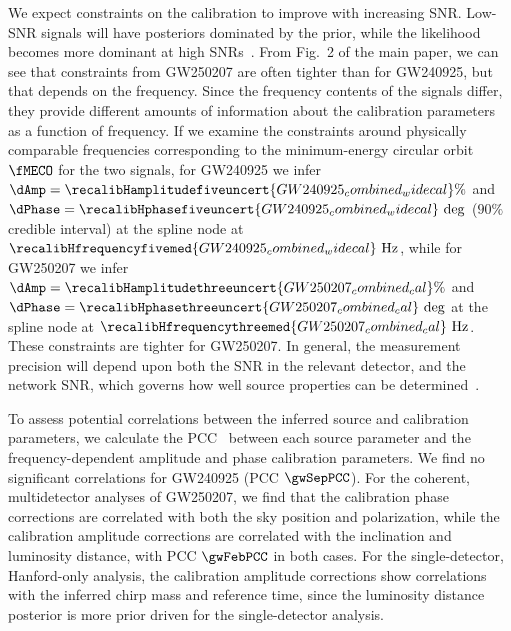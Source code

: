 We expect constraints on the calibration to improve with increasing \ac{SNR}.
Low-\ac{SNR} signals will have posteriors dominated by the prior, while the likelihood becomes more dominant at high \acp{SNR}~\cite{Essick:2019dow,Essick:2022vzl}.
From Fig.~2 of the main paper, we can see that constraints from \ac{GW250207} are often tighter than for \ac{GW240925}, but that depends on the frequency.
Since the frequency contents of the signals differ, they provide different amounts of information about the calibration parameters as a function of frequency.
If we examine the constraints around physically comparable frequencies corresponding to the minimum-energy circular orbit $\fMECO$ for the two signals, for \ac{GW240925} we infer $\dAmp = \recalibHamplitudefiveuncert{GW240925_combined_widecal}\%$ and $\dPhase = \recalibHphasefiveuncert{GW240925_combined_widecal}~\mathrm{deg}$ ($90\%$ credible interval) at the spline node at $\recalibHfrequencyfivemed{GW240925_combined_widecal}~\mathrm{Hz}$, while for \ac{GW250207} we infer $\dAmp = \recalibHamplitudethreeuncert{GW250207_combined_cal}\%$ and $\dPhase = \recalibHphasethreeuncert{GW250207_combined_cal}~\mathrm{deg}$ at the spline node at $\recalibHfrequencythreemed{GW250207_combined_cal}~\mathrm{Hz}$.
These constraints are tighter for \ac{GW250207}.
In general, the measurement precision will depend upon both the \ac{SNR} in the relevant detector, and the network \ac{SNR}, which governs how well source properties can be determined~\cite{Cutler:1994ys,Purrer:2019jcp,LIGOScientific:2019hgc,Payne:2020myg,Vitale:2020gvb}.

To assess potential correlations between the inferred source and calibration parameters, we calculate the \ac{PCC}~\cite{Pearson:1895} between each source parameter and the frequency-dependent amplitude and phase calibration parameters.
We find no significant correlations for \ac{GW240925} (\ac{PCC} $\gwSepPCC$).
For the coherent, multidetector analyses of \ac{GW250207}, we find that the calibration phase corrections are correlated with both the sky position and polarization, while the calibration amplitude corrections are correlated with the inclination and luminosity distance, with \ac{PCC} $\gwFebPCC$ in both cases.
For the single-detector, Hanford-only analysis, the calibration amplitude corrections show correlations with the inferred chirp mass and reference time, since the luminosity distance posterior is more prior driven for the single-detector analysis.

